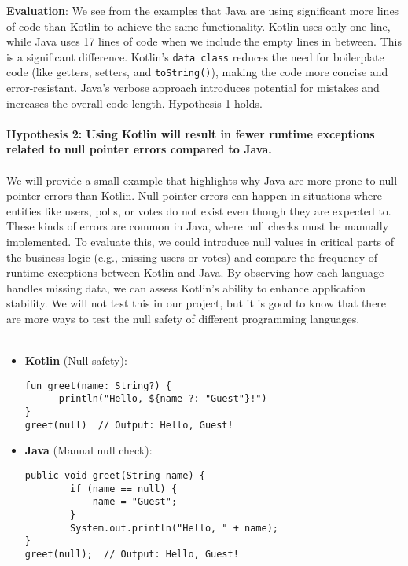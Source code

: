 \noindent \textbf{Evaluation}: We see from the examples that Java are using significant more lines of code than Kotlin to achieve the same functionality. Kotlin uses only one line, while Java uses 17 lines of code when we include the empty lines in between. This is a significant difference. Kotlin's \texttt{data class} reduces the need for boilerplate code (like getters, setters, and \texttt{toString()}), making the code more concise and error-resistant. Java’s verbose approach introduces potential for mistakes and increases the overall code length. Hypothesis 1 holds. 
\\
\\
\textbf{Hypothesis 2: Using Kotlin will result in fewer runtime exceptions related to null pointer errors compared to Java.} 
\\
\\ 
We will provide a small example that highlights why Java are more prone to null pointer errors than Kotlin. Null pointer errors can happen in situations where entities like users, polls, or votes do not exist even though they are expected to. These kinds of errors are common in Java, where null checks must be manually implemented. To evaluate this, we could introduce null values in critical parts of the business logic (e.g., missing users or votes) and compare the frequency of runtime exceptions between Kotlin and Java. By observing how each language handles missing data, we can assess Kotlin’s ability to enhance application stability. We will not test this in our project, but it is good to know that there are more ways to test the null safety of different programming languages.
\\
\\
\begin{tcolorbox}[colframe=blue!80!black, colback=blue!5!white, coltitle=blue!50!black, title={-}, boxrule=0.5mm, width=0.8\textwidth, sharp corners=south]
    \begin{itemize}
    \vspace{0.2cm}
        \item \textbf{\scriptsize Kotlin} (\scriptsize Null safety):
        \begin{lstlisting}[style=kotlin, basicstyle=\scriptsize\ttfamily]
fun greet(name: String?) {
      println("Hello, ${name ?: "Guest"}!")
}
greet(null)  // Output: Hello, Guest!
        \end{lstlisting}
        
        \item \textbf{\scriptsize Java} (\scriptsize Manual null check):
        \begin{lstlisting}[style=java, basicstyle=\scriptsize\ttfamily]
public void greet(String name) {
        if (name == null) {
            name = "Guest";
        }
        System.out.println("Hello, " + name);
}
greet(null);  // Output: Hello, Guest!
        \end{lstlisting}
    \end{itemize}
\end{tcolorbox}

